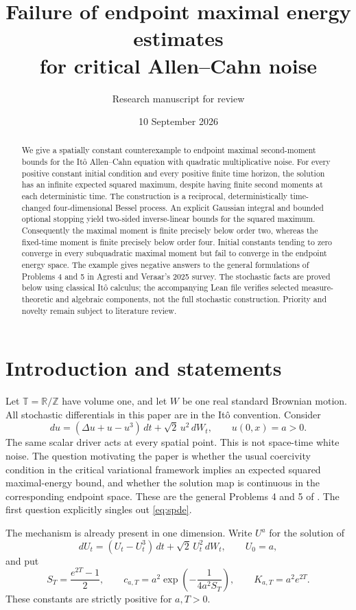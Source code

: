 \documentclass[11pt]{article}
\title{Failure of endpoint maximal energy estimates\protect\\for critical Allen--Cahn noise}
\author{Research manuscript for review}
\date{10 September 2026}
\theoremstyle{remark}\newtheorem{remark}[theorem]{Remark}
\newcommand{\R}{\mathbb R}\newcommand{\T}{\mathbb T}
\begin{document}
\maketitle
\begin{abstract}
We give a spatially constant counterexample to endpoint maximal second-moment bounds for the It\^o Allen--Cahn equation with quadratic multiplicative noise. For every positive constant initial condition and every positive finite time horizon, the solution has an infinite expected squared maximum, despite having finite second moments at each deterministic time. The construction is a reciprocal, deterministically time-changed four-dimensional Bessel process. An explicit Gaussian integral and bounded optional stopping yield two-sided inverse-linear bounds for the squared maximum. Consequently the maximal moment is finite precisely below order two, whereas the fixed-time moment is finite precisely below order four. Initial constants tending to zero converge in every subquadratic maximal moment but fail to converge in the endpoint energy space. The example gives negative answers to the general formulations of Problems 4 and 5 in Agresti and Veraar's 2025 survey. The stochastic facts are proved below using classical It\^o calculus; the accompanying Lean file verifies selected measure-theoretic and algebraic components, not the full stochastic construction. Priority and novelty remain subject to literature review.
\end{abstract}

\section{Introduction and statements}
Let $\T=\R/\mathbb Z$ have volume one, and let $W$ be one real standard Brownian motion. All stochastic differentials in this paper are in the It\^o convention. Consider
\begin{equation}\label{eq:spde}
 du=(\Delta u+u-u^3)\,dt+\sqrt2\,u^2\,dW_t,
 \qquad u(0,x)=a>0.
\end{equation}
The same scalar driver acts at every spatial point. This is not space-time white noise. The question motivating the paper is whether the usual coercivity condition in the critical variational framework implies an expected squared maximal-energy bound, and whether the solution map is continuous in the corresponding endpoint space. These are the general Problems 4 and 5 of \cite{AV25}. The first question explicitly singles out \eqref{eq:spde}.

The mechanism is already present in one dimension. Write $U^a$ for the solution of
\begin{equation}\label{eq:sde}
 dU_t=(U_t-U_t^3)\,dt+\sqrt2\,U_t^2\,dW_t,
 \qquad U_0=a,
\end{equation}
and put
\begin{equation}\label{eq:constants}
 S_T=\frac{e^{2T}-1}{2},\qquad
 c_{a,T}=a^2\exp\left(-\frac{1}{4a^2S_T}\right),\qquad
 K_{a,T}=a^2e^{2T}.
\end{equation}
These constants are strictly positive for $a,T>0$.
\end{document}
